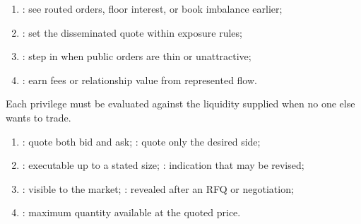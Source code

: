 \documentclass[a4paper,oneside,openany]{book}
\begin{document}
\begin{taxonomy} 
\begin{enumerate}[label=\roman*.]
\setlength{\itemsep}{0pt}
\item {}: see routed orders, floor interest, or book imbalance earlier;
\item {}: set the disseminated quote within exposure rules;
\item {}: step in when public orders are thin or unattractive;
\item {}: earn fees or relationship value from represented flow.
\end{enumerate}
Each privilege must be evaluated against the liquidity supplied when no one else wants to trade.
\end{taxonomy}

\begin{taxonomy} 
\begin{enumerate}[label=\roman*.]
\setlength{\itemsep}{0pt}
\item {}: quote both bid and ask; : quote only the desired side;
\item {}: executable up to a stated size; : indication that may be revised;
\item {}: visible to the market; : revealed after an RFQ or negotiation;
\item {}: maximum quantity available at the quoted price.
\end{enumerate}
\end{taxonomy}




\end{document}
